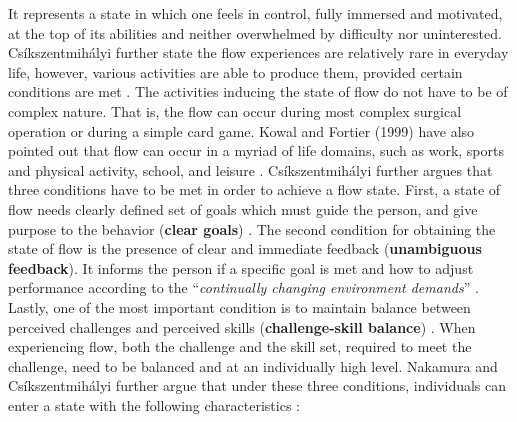 It represents a state in which one feels in control, fully immersed and motivated, at the top of its abilities and neither overwhelmed by difficulty nor uninterested. Cs\'{i}kszentmih\'{a}lyi further state the flow experiences are relatively rare in everyday life, however, various activities are able to produce them, provided certain conditions are met \cite{csikszentmihalyi2014flow}. The activities inducing the state of flow do not have to be of complex nature. That is, the flow can occur during most complex surgical operation or during a simple card game. Kowal and Fortier (1999) have also pointed out that flow can occur in a myriad of life domains, such as work, sports and physical activity, school, and leisure \cite{kowal1999motivational}. Cs\'{i}kszentmih\'{a}lyi further argues that three conditions have to be met in order to achieve a flow state. First, a state of flow needs clearly defined set of goals which must guide the person, and give purpose to the behavior (\textbf{clear goals}) \cite{csikszentmihalyi2014flow}. The second condition for obtaining the state of flow is the presence of clear and immediate feedback (\textbf{unambiguous
feedback}). It informs the person if a specific goal is met and how to adjust performance according to the ``\textit{continually  changing environment demands}'' \cite{csikszentmihalyi2014flow}. Lastly, one of the most important condition is to maintain balance between perceived challenges and perceived skills (\textbf{challenge-skill balance}) \cite{csikszentmihalyi2014flow}. When experiencing flow, both the challenge and the skill set, required to meet the challenge, need to be balanced and at an individually high level. Nakamura and Cs\'{i}kszentmih\'{a}lyi further argue that under these three conditions, individuals can enter a state with the following characteristics \cite{nakamura2014concept, csikszentmihalyi2014flow}:
